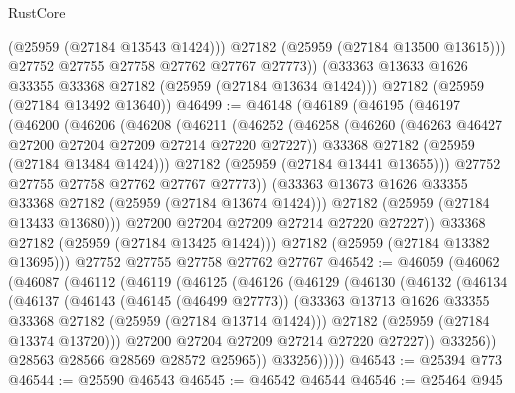 \begin{lexlean}{RustCore}
\begin{coremodule}
            (@25959 (@27184 @13543 @1424)))
          @27182
          (@25959 (@27184 @13500 @13615)))
        @27752
        @27755
        @27758
        @27762
        @27767
        @27773))
    (@33363 @13633 @1626 @33355 @33368 @27182 (@25959 (@27184 @13634 @1424)))
    @27182
    (@25959 (@27184 @13492 @13640))
@46499 := @46148
    (@46189
      (@46195
        (@46197
          (@46200
            (@46206
              (@46208
                (@46211
                  (@46252
                    (@46258
                      (@46260 (@46263 @46427 @27200 @27204 @27209 @27214 @27220 @27227))
                      @33368
                      @27182
                      (@25959 (@27184 @13484 @1424)))
                    @27182
                    (@25959 (@27184 @13441 @13655)))
                  @27752
                  @27755
                  @27758
                  @27762
                  @27767
                  @27773))
              (@33363 @13673 @1626 @33355 @33368 @27182 (@25959 (@27184 @13674 @1424)))
              @27182
              (@25959 (@27184 @13433 @13680)))
            @27200
            @27204
            @27209
            @27214
            @27220
            @27227))
        @33368
        @27182
        (@25959 (@27184 @13425 @1424)))
      @27182
      (@25959 (@27184 @13382 @13695)))
    @27752
    @27755
    @27758
    @27762
    @27767
@46542 := @46059
    (@46062
      (@46087
        (@46112
          (@46119
            (@46125
              (@46126
                (@46129
                  (@46130
                    (@46132
                      (@46134
                        (@46137
                          (@46143
                            (@46145 (@46499 @27773))
                            (@33363
                              @13713
                              @1626
                              @33355
                              @33368
                              @27182
                              (@25959 (@27184 @13714 @1424)))
                            @27182
                            (@25959 (@27184 @13374 @13720)))
                          @27200
                          @27204
                          @27209
                          @27214
                          @27220
                          @27227))
                      @33256))
                  @28563
                  @28566
                  @28569
                  @28572
                  @25965))
              @33256)))))
@46543 := @25394 @773
@46544 := @25590 @46543
@46545 := @46542 @46544
@46546 := @25464 @945

\end{coremodule}
\end{lexlean}
